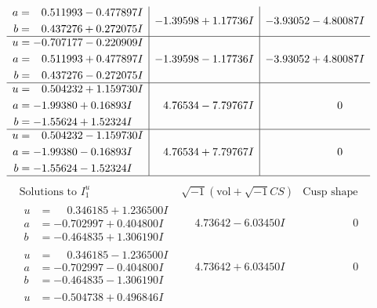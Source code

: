 \documentclass[1p]{elsarticle_modified}
\theoremstyle{definition}
\newcommand{\I}{\sqrt{-1}}
\begin{document}
$$\begin{array}{c|c|c}
\begin{aligned}
a &= \phantom{-}0.511993 - 0.477897 I \\
b &= \phantom{-}0.437276 + 0.272075 I\end{aligned}
 & -1.39598 + 1.17736 I & -3.93052 - 4.80087 I \\ \hline\begin{aligned}
u &= -0.707177 - 0.220909 I \\
a &= \phantom{-}0.511993 + 0.477897 I \\
b &= \phantom{-}0.437276 - 0.272075 I\end{aligned}
 & -1.39598 - 1.17736 I & -3.93052 + 4.80087 I \\ \hline\begin{aligned}
u &= \phantom{-}0.504232 + 1.159730 I \\
a &= -1.99380 + 0.16893 I \\
b &= -1.55624 + 1.52324 I\end{aligned}
 & \phantom{-}4.76534 - 7.79767 I & \phantom{-0.000000 } 0 \\ \hline\begin{aligned}
u &= \phantom{-}0.504232 - 1.159730 I \\
a &= -1.99380 - 0.16893 I \\
b &= -1.55624 - 1.52324 I\end{aligned}
 & \phantom{-}4.76534 + 7.79767 I & \phantom{-0.000000 } 0\\
 \hline 
 \end{array}$$\newpage$$\begin{array}{c|c|c}  
\text{Solutions to }I^u_{1}& \I (\text{vol} + \sqrt{-1}CS) & \text{Cusp shape}\\
 \hline 
\begin{aligned}
u &= \phantom{-}0.346185 + 1.236500 I \\
a &= -0.702997 + 0.404800 I \\
b &= -0.464835 + 1.306190 I\end{aligned}
 & \phantom{-}4.73642 - 6.03450 I & \phantom{-0.000000 } 0 \\ \hline\begin{aligned}
u &= \phantom{-}0.346185 - 1.236500 I \\
a &= -0.702997 - 0.404800 I \\
b &= -0.464835 - 1.306190 I\end{aligned}
 & \phantom{-}4.73642 + 6.03450 I & \phantom{-0.000000 } 0 \\ \hline\begin{aligned}
u &= -0.504738 + 0.496846 I \\

\end{aligned}
\end{array}$$
\end{document}
